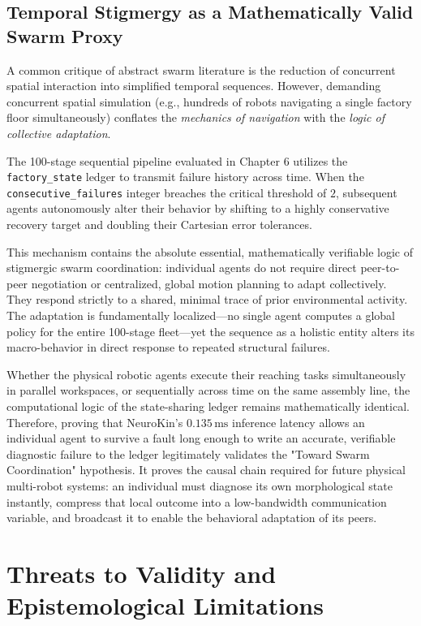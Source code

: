 \documentclass[12pt,a4paper,oneside]{report}
\begin{document}
\subsection{Temporal Stigmergy as a Mathematically Valid Swarm Proxy}

A common critique of abstract swarm literature is the reduction of concurrent spatial interaction into simplified temporal sequences. However, demanding concurrent spatial simulation (e.g., hundreds of robots navigating a single factory floor simultaneously) conflates the \textit{mechanics of navigation} with the \textit{logic of collective adaptation}. 

The 100-stage sequential pipeline evaluated in Chapter 6 utilizes the \texttt{factory\_state} ledger to transmit failure history across time. When the \texttt{consecutive\_failures} integer breaches the critical threshold of $2$, subsequent agents autonomously alter their behavior by shifting to a highly conservative recovery target and doubling their Cartesian error tolerances. 

This mechanism contains the absolute essential, mathematically verifiable logic of stigmergic swarm coordination: individual agents do not require direct peer-to-peer negotiation or centralized, global motion planning to adapt collectively. They respond strictly to a shared, minimal trace of prior environmental activity. The adaptation is fundamentally localized—no single agent computes a global policy for the entire 100-stage fleet—yet the sequence as a holistic entity alters its macro-behavior in direct response to repeated structural failures. 

Whether the physical robotic agents execute their reaching tasks simultaneously in parallel workspaces, or sequentially across time on the same assembly line, the computational logic of the state-sharing ledger remains mathematically identical. Therefore, proving that NeuroKin's $0.135\,\mathrm{ms}$ inference latency allows an individual agent to survive a fault long enough to write an accurate, verifiable diagnostic failure to the ledger legitimately validates the "Toward Swarm Coordination" hypothesis. It proves the causal chain required for future physical multi-robot systems: an individual must diagnose its own morphological state instantly, compress that local outcome into a low-bandwidth communication variable, and broadcast it to enable the behavioral adaptation of its peers.

\section{Threats to Validity and Epistemological Limitations}
\end{document}
